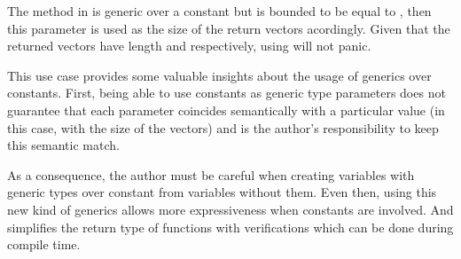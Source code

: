 The  method in  is generic
over a constant  but is bounded to be equal to , then
this parameter is used as the size of the return vectors acordingly. Given that
the returned vectors have length  and  respectively,
using  will not panic.

This use case provides some valuable insights about the usage of generics over
constants. First, being able to use constants as generic type parameters does
not guarantee that each parameter coincides semantically with a particular
value (in this case, with the size of the vectors) and is the author's
responsibility to keep this semantic match. 

As a consequence, the author must be careful when creating variables with
generic types over constant from variables without them. Even then, using this
new kind of generics allows more expressiveness when constants are involved.
And simplifies the return type of functions with verifications which can be
done during compile time.
